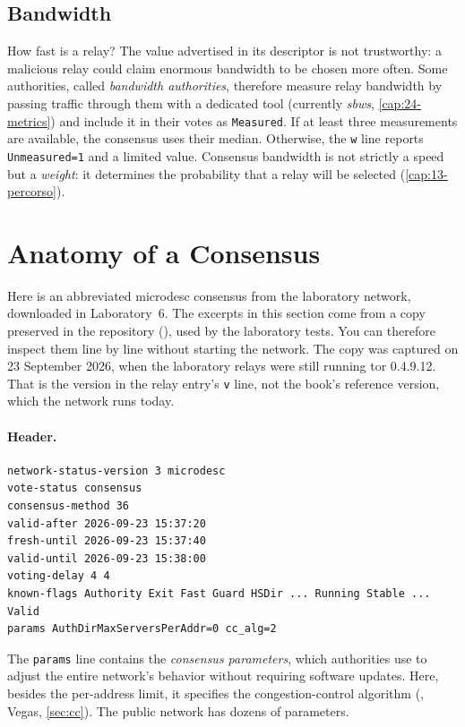 \subsection{Bandwidth}

How fast is a relay? The value advertised in its descriptor is not trustworthy: a malicious relay could claim enormous bandwidth to be chosen more often. Some authorities, called \emph{bandwidth authorities}, therefore measure relay bandwidth by passing traffic through them with a dedicated tool (currently \emph{sbws}, \cref{cap:24-metrics}) and include it in their votes as \texttt{Measured}. If at least three measurements are available, the consensus uses their median. Otherwise, the \texttt{w} line reports \texttt{Unmeasured=1} and a limited value. Consensus bandwidth is not strictly a speed but a \emph{weight}: it determines the probability that a relay will be selected (\cref{cap:13-percorso}).

\section{Anatomy of a Consensus}\label{sec:dir-anatomia}

Here is an abbreviated microdesc consensus from the laboratory network, downloaded in Laboratory~6. The excerpts in this section come from a copy preserved in the repository (), used by the laboratory tests. You can therefore inspect them line by line without starting the network. The copy was captured on 23 September 2026, when the laboratory relays were still running tor 0.4.9.12. That is the version in the relay entry's \texttt{v} line, not the book's reference version, which the network runs today.

\paragraph{Header.}
\begin{lstlisting}[numbers=none]
network-status-version 3 microdesc
vote-status consensus
consensus-method 36
valid-after 2026-09-23 15:37:20
fresh-until 2026-09-23 15:37:40
valid-until 2026-09-23 15:38:00
voting-delay 4 4
known-flags Authority Exit Fast Guard HSDir ... Running Stable ... Valid
params AuthDirMaxServersPerAddr=0 cc_alg=2
\end{lstlisting}
The \texttt{params} line contains the \emph{consensus parameters}, which authorities use to adjust the entire network's behavior without requiring software updates. Here, besides the per-address limit, it specifies the congestion-control algorithm (, Vegas, \cref{sec:cc}). The public network has dozens of parameters.


